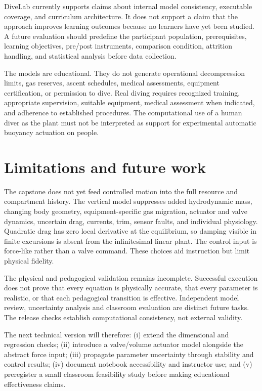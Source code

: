 \documentclass[
]{article}
\begin{document}
DiveLab currently supports claims about internal model consistency,
executable coverage, and curriculum architecture. It does not support a
claim that the approach improves learning outcomes because no learners
have yet been studied. A future evaluation should predefine the
participant population, prerequisites, learning objectives, pre/post
instruments, comparison condition, attrition handling, and statistical
analysis before data collection.

The models are educational. They do not generate operational
decompression limits, gas reserves, ascent schedules, medical
assessments, equipment certification, or permission to dive. Real diving
requires recognized training, appropriate supervision, suitable
equipment, medical assessment when indicated, and adherence to
established procedures. The computational use of a human diver as the
plant must not be interpreted as support for experimental automatic
buoyancy actuation on people.

\hypertarget{limitations-and-future-work}{%
\section{Limitations and future
work}\label{limitations-and-future-work}}

The capstone does not yet feed controlled motion into the full resource
and compartment history. The vertical model suppresses added
hydrodynamic mass, changing body geometry, equipment-specific gas
migration, actuator and valve dynamics, uncertain drag, currents, trim,
sensor faults, and individual physiology. Quadratic drag has zero local
derivative at the equilibrium, so damping visible in finite excursions
is absent from the infinitesimal linear plant. The control input is
force-like rather than a valve command. These choices aid instruction
but limit physical fidelity.

The physical and pedagogical validation remains incomplete. Successful
execution does not prove that every equation is physically accurate,
that every parameter is realistic, or that each pedagogical transition
is effective. Independent model review, uncertainty analysis and
classroom evaluation are distinct future tasks. The release checks
establish computational consistency, not external validity.

The next technical version will therefore: (i) extend the dimensional
and regression checks; (ii) introduce a valve/volume actuator model
alongside the abstract force input; (iii) propagate parameter
uncertainty through stability and control results; (iv) document
notebook accessibility and instructor use; and (v) preregister a small
classroom feasibility study before making educational effectiveness
claims.
\end{document}
